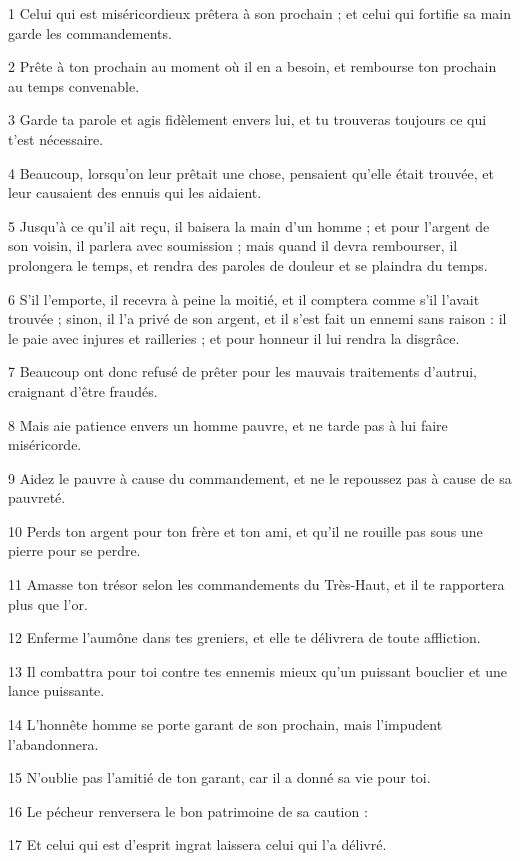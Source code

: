 \par 1 Celui qui est miséricordieux prêtera à son prochain ; et celui qui fortifie sa main garde les commandements.
\par 2 Prête à ton prochain au moment où il en a besoin, et rembourse ton prochain au temps convenable.
\par 3 Garde ta parole et agis fidèlement envers lui, et tu trouveras toujours ce qui t'est nécessaire.
\par 4 Beaucoup, lorsqu'on leur prêtait une chose, pensaient qu'elle était trouvée, et leur causaient des ennuis qui les aidaient.
\par 5 Jusqu'à ce qu'il ait reçu, il baisera la main d'un homme ; et pour l'argent de son voisin, il parlera avec soumission ; mais quand il devra rembourser, il prolongera le temps, et rendra des paroles de douleur et se plaindra du temps.
\par 6 S'il l'emporte, il recevra à peine la moitié, et il comptera comme s'il l'avait trouvée ; sinon, il l'a privé de son argent, et il s'est fait un ennemi sans raison : il le paie avec injures et railleries ; et pour honneur il lui rendra la disgrâce.
\par 7 Beaucoup ont donc refusé de prêter pour les mauvais traitements d'autrui, craignant d'être fraudés.
\par 8 Mais aie patience envers un homme pauvre, et ne tarde pas à lui faire miséricorde.
\par 9 Aidez le pauvre à cause du commandement, et ne le repoussez pas à cause de sa pauvreté.
\par 10 Perds ton argent pour ton frère et ton ami, et qu'il ne rouille pas sous une pierre pour se perdre.
\par 11 Amasse ton trésor selon les commandements du Très-Haut, et il te rapportera plus que l'or.
\par 12 Enferme l'aumône dans tes greniers, et elle te délivrera de toute affliction.
\par 13 Il combattra pour toi contre tes ennemis mieux qu'un puissant bouclier et une lance puissante.
\par 14 L'honnête homme se porte garant de son prochain, mais l'impudent l'abandonnera.
\par 15 N'oublie pas l'amitié de ton garant, car il a donné sa vie pour toi.
\par 16 Le pécheur renversera le bon patrimoine de sa caution :
\par 17 Et celui qui est d'esprit ingrat laissera celui qui l'a délivré.
